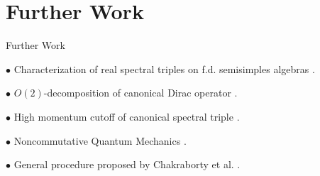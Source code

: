 \section{Further Work}

\begin{frame}{Further Work}
    
    
    $\bullet$ Characterization of real spectral triples on f.d. semisimples algebras \cite{PaschkeSitarz1998}.
    
    $\bullet$ $O(2)$-decomposition of canonical Dirac operator \cite{DAndrea2013}. 
    
    $\bullet$ High momentum cutoff of canonical spectral triple \cite{DAndrea2014}.
    
    $\bullet$ Noncommutative Quantum Mechanics \cite{Scholtz2009, Scholtz2013}.

    
    $\bullet$ General procedure proposed by Chakraborty et al. \cite{ChaobaDevi2018}.
    
    
\end{frame}